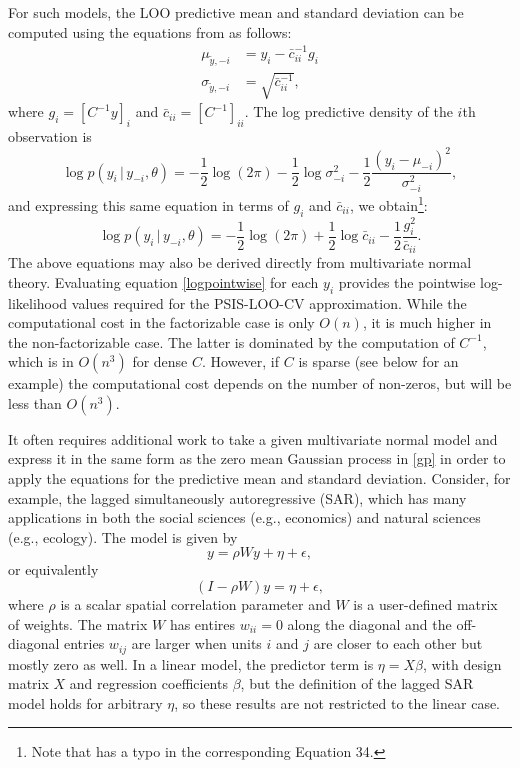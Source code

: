 \documentclass[11pt]{article}
\begin{document}
For such models, the LOO predictive mean and standard deviation can be computed
using the equations from \cite{sundararajan2001} as follows:
%
\begin{align}
\label{ypredpars}
  \mu_{\tilde{y},-i} &= y_i-\bar{c}_{ii}^{-1} g_i \nonumber \\
  \sigma_{\tilde{y},-i} &= \sqrt{\bar{c}_{ii}^{-1}},
\end{align}
%
where $g_i = \left[C^{-1} y\right]_i$ and
$\bar{c}_{ii} = \left[C^{-1}\right]_{ii}$.
The log predictive density of the $i$th observation is
%
\begin{equation}
  \log p(y_i \,|\, y_{-i},\theta)
  = - \frac{1}{2}\log(2\pi)
  - \frac{1}{2}\log \sigma^2_{-i}
  - \frac{1}{2}\frac{(y_i-\mu_{-i})^2}{\sigma^2_{-i}},
\end{equation}
%
and expressing this same equation in terms of $g_i$ and $\bar{c}_{ii}$, we
obtain\footnote{ Note that \cite{vehtari2016} has a typo in the corresponding
Equation 34.}:
%
\begin{equation}
\label{logpointwise}
  \log p(y_i \,|\, y_{-i},\theta)
  = - \frac{1}{2}\log(2\pi)
  + \frac{1}{2}\log \bar{c}_{ii}
  - \frac{1}{2}\frac{g_i^2}{\bar{c}_{ii}}.
\end{equation}
%
The above equations may also be derived directly from multivariate normal theory. Evaluating equation \eqref{logpointwise} for each $y_i$ provides the pointwise
log-likelihood values required for the PSIS-LOO-CV approximation. 
While the computational cost in the factorizable case is only $O(n)$, it is much higher in the non-factorizable case. The latter is dominated by the computation of $C^{-1}$, which is in $O(n^3)$ for dense $C$. However, if $C$ is sparse (see below for an example) the computational cost depends on the number of non-zeros, but will be less than $O(n^3)$.

It often requires additional work to take a given multivariate normal
model and express it in the same form as the zero mean Gaussian process 
in \eqref{gp} in order to apply the equations for the predictive 
mean and standard deviation. Consider, for example, the lagged simultaneously 
autoregressive (SAR), which has many applications in both the social sciences 
(e.g., economics) and natural sciences (e.g., ecology). The model is given by 
%
\begin{equation}
y = \rho W y + \eta + \epsilon,
\end{equation}
%
or equivalently 
%
\begin{equation}
(I - \rho W) y = \eta + \epsilon,
\end{equation}
%
where $\rho$ is a scalar spatial correlation parameter and $W$ is a user-defined matrix of weights. 
The matrix $W$ has entires $w_{ii} = 0$ along the diagonal and the off-diagonal entries $w_{ij}$
are larger when units $i$ and $j$ are closer to each other but mostly zero as well. In a linear model, the predictor 
term is $\eta = X \beta$, with design matrix $X$ and regression coefficients $\beta$,
but the definition of the lagged SAR model holds for arbitrary $\eta$, so 
these results are not restricted to the linear case.  
\end{document}
